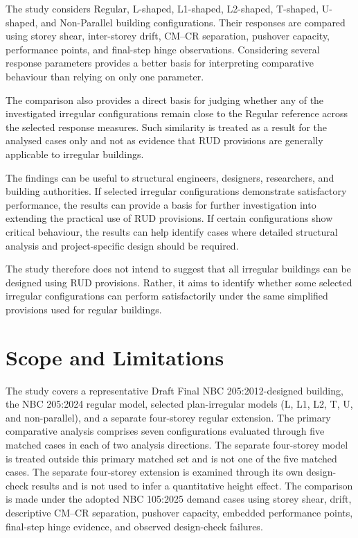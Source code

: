The study considers Regular, L-shaped, L1-shaped, L2-shaped, T-shaped, U-shaped, and Non-Parallel building configurations. Their responses are compared using storey shear, inter-storey drift, CM--CR separation, pushover capacity, performance points, and final-step hinge observations. Considering several response parameters provides a better basis for interpreting comparative behaviour than relying on only one parameter.

The comparison also provides a direct basis for judging whether any of the investigated irregular configurations remain close to the Regular reference across the selected response measures. Such similarity is treated as a result for the analysed cases only and not as evidence that RUD provisions are generally applicable to irregular buildings.

The findings can be useful to structural engineers, designers, researchers, and building authorities. If selected irregular configurations demonstrate satisfactory performance, the results can provide a basis for further investigation into extending the practical use of RUD provisions. If certain configurations show critical behaviour, the results can help identify cases where detailed structural analysis and project-specific design should be required.

The study therefore does not intend to suggest that all irregular buildings can be designed using RUD provisions. Rather, it aims to identify whether some selected irregular configurations can perform satisfactorily under the same simplified provisions used for regular buildings.



\section{Scope and Limitations}
The study covers a representative Draft Final NBC 205:2012-designed building, the NBC 205:2024 regular model, selected plan-irregular models (L, L1, L2, T, U, and non-parallel), and a separate four-storey regular extension. The primary comparative analysis comprises seven configurations evaluated through five matched cases in each of two analysis directions. The separate four-storey model is treated outside this primary matched set and is not one of the five matched cases. The separate four-storey extension is examined through its own design-check results and is not used to infer a quantitative height effect. The comparison is made under the adopted NBC 105:2025 demand cases using storey shear, drift, descriptive CM--CR separation, pushover capacity, embedded performance points, final-step hinge evidence, and observed design-check failures.

